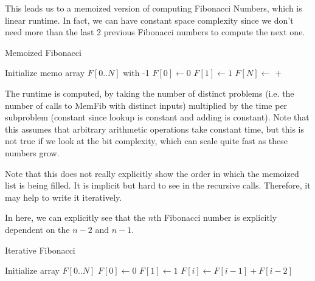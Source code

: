 \documentclass{article}
\begin{document}
    \begin{algo}
      This leads us to a memoized version of computing Fibonacci Numbers, which is linear runtime. In fact, we can have constant space complexity since we don't need more than the last 2 previous Fibonacci numbers to compute the next one. 
      
      \begin{algorithm}[H]
        \caption{Memoized Fibonacci}
        \label{alg:memfib_rec}
        \begin{algorithmic}
          \State Initialize memo array $F[0..N]$ with -1
          \State $F[0] \gets 0$
          \State $F[1] \gets 1$
              \State {}
              \State {}
            \Else
              \State $F[N] \gets$  + 
              \State {}
            \EndIf
          \EndFunction
        \end{algorithmic}
      \end{algorithm}

      The runtime is computed, by taking the number of distinct problems (i.e. the number of calls to MemFib with distinct inputs) multiplied by the time per subproblem (constant since lookup is constant and adding is constant). Note that this assumes that arbitrary arithmetic operations take constant time, but this is not true if we look at the bit complexity, which can scale quite fast as these numbers grow. 
    \end{algo}

    Note that this does not really explicitly show the order in which the memoized list is being filled. It is implicit but hard to see in the recursive calls. Therefore, it may help to write it iteratively. 


    \begin{algo}
      In here, we can explicitly see that the $n$th Fibonacci number is explicitly dependent on the $n-2$ and $n-1$. 
      \begin{algorithm}[H]
        \caption{Iterative Fibonacci}
        \label{alg:iterfib}
        \begin{algorithmic}
          \State Initialize array $F[0..N]$
          \State $F[0] \gets 0$
          \State $F[1] \gets 1$
            \State $F[i] \gets F[i-1] + F[i-2]$
          \EndFor
          \State {}
        \end{algorithmic}
      \end{algorithm}
    \end{algo}
\end{document}
